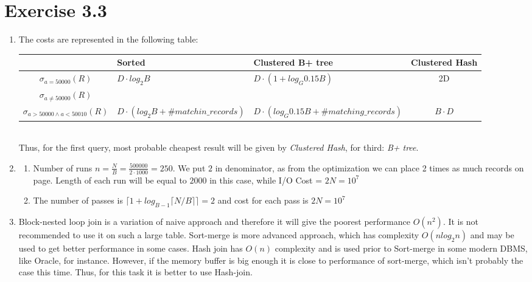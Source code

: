 \documentclass[10pt]{article}
\begin{document}
  \section*{Exercise 3.3}
   \begin{enumerate}[label=\arabic*.]
      \item The costs are represented in the following table:\\
      	\begin{tabular}{ c | m{3cm} | m{3cm} | c}
			 & Sorted & Clustered B+ tree & Clustered Hash\\
            \hline
           $\sigma_{a=50000}(R)$ & $D\cdot log_2 B$ & $D\cdot (1+log_G 0.15B)$ & 2D \\
           $\sigma_{a \neq 50000}(R)$ &  &  &  \\
           $\sigma_{a>50000 \wedge a < 50010}(R)$ & $D\cdot (log_2 B + \#matchin\_records)$ & $D\cdot (log_G 0.15B + \#matching\_records)$ & $B\cdot D$ \\
            \hline
		\end{tabular}
        \\Thus, for the first query, most probable cheapest result will be given by \textit{Clustered Hash}, for third: \textit{B+ tree}.
      \item
        \begin{enumerate}[label=\alph*.]
          \item
            Number of runs $n = \frac{N}{B} = \frac{500000}{2\cdot 1000} = 250$. We put $2$ in denominator, as from the optimization we can place 2 times as much records on page. Length of each run will be equal to $2000$ in this case, while I/O Cost = $2N = 10^7$
          \item
          The number of passes is $\lceil 1+log_{B-1} \lceil N/B \rceil \rceil = 2$ and cost for each pass is $2N = 10^7$
        \end{enumerate}
      \item
      	Block-nested loop join is a variation of naive approach and therefore it will give the poorest performance $O(n^2)$. It is not recommended to use it on such a large table. Sort-merge is more advanced approach, which has complexity $O(nlog_2 n)$ and may be used to get better performance in some cases. Hash join has $O(n)$ complexity and is used prior to Sort-merge in some modern DBMS, like Oracle, for instance. However, if the memory buffer is big enough it is close to performance of sort-merge, which isn't probably the case this time. Thus, for this task it is better to use Hash-join.
  \end{enumerate}
\end{document}
